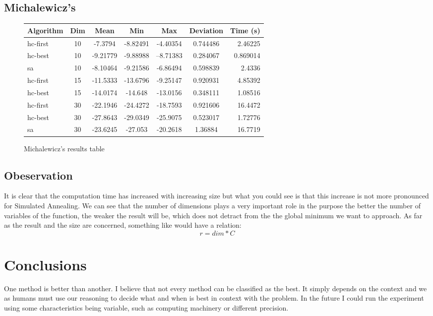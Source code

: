 \documentclass{article}
\begin{document}
        \subsection{Michalewicz's}
        \begin{figure}[H]
            \centering
            \begin{tabular}{|l|c|c|c|c|c|r|}
                \hline Algorithm & Dim & Mean & Min & Max & Deviation & Time (s) \\
                \hline hc-first & 10 & -7.3794 & -8.82491 & -4.40354 & 0.744486 & 2.46225 \\
                \hline hc-best & 10 & -9.21779 & -9.88988 & --8.71383 & 0.284067 & 0.869014 \\
                \hline sa & 10 & -8.10464 & -9.21586 & -6.86494 & 0.598839 & 2.4336 \\
                \hline hc-first & 15 & -11.5333 & -13.6796 & -9.25147 & 0.920931 & 4.85392 \\
                \hline hc-best & 15 & -14.0174 & -14.648 & -13.0156 & 0.348111 & 1.08516 \\
                \hline hc-first & 30 & -22.1946 & -24.4272 & -18.7593 & 0.921606 & 16.4472 \\
                \hline hc-best & 30 & -27.8643 & -29.0349 & -25.9075 & 0.523017 & 1.72776 \\
                \hline sa & 30 & -23.6245 & -27.053 & -20.2618 & 1.36884 & 16.7719 \\
                \hline
            \end{tabular}
            \caption{Michalewicz's results table}
        \end{figure}

\subsection{Obeservation}
    It is clear that the computation time has increased with increasing size but what you could see is that this increase is not more pronounced for Simulated Annealing. \newline
    We can see that the number of dimensions plays a very important role in the purpose the better the number of variables of the function, the weaker the result will be, which does not detract from the the global minimum we want to approach.\newline
    As far as the result and the size are concerned, something like would have a relation: $$ r = dim * C $$ 
\section{Conclusions}
    One method is better than another. I believe that not every method can be classified as the best. It simply depends on the context and we as humans must use our reasoning to decide what and when is best in context with the problem. \newline
    In the future I could run the experiment using some characteristics being variable, such as computing machinery or different precision.
\end{document}
